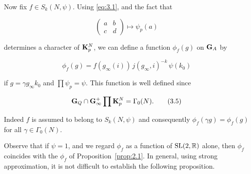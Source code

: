 Now fix $f \in S_k(N,\psi)$. Using \eqref{eq:3.1}, and the fact that

\[
\begin{pmatrix} a & b \\ c & d \end{pmatrix} \mapsto \psi_p(a)
\]

determines a character of $\mathbf{K}_p^N$, we can define a function $\phi_f(g)$ on $\mathbf{G}_A$ by

\begin{equation}\label{eq:3.4}
\phi_f(g) = f(g_\infty(i))\,j(g_\infty,i)^{-k}\,\psi(k_0)\tag{3.4}
\end{equation}

if $g = \gamma g_\infty k_0$ and $\prod \psi_p = \psi$. This function is well defined since

\begin{equation}\label{eq:3.5}
\mathbf{G}_Q \cap \mathbf{G}_\infty^+ \prod \mathbf{K}_p^N = \Gamma_0(N).\tag{3.5}
\end{equation}

Indeed $f$ is assumed to belong to $S_k(N,\psi)$ and consequently $\phi_f(\gamma g) = \phi_f(g)$ for all $\gamma \in \Gamma_0(N)$.

Observe that if $\psi = 1$, and we regard $\phi_f$ as a function of $\operatorname{SL}(2,\mathbb{R})$ alone, then $\phi_f$ coincides with the $\phi_f$ of Proposition~\ref{prop:2.1}. In general, using strong approximation, it is not difficult to establish the following proposition.

